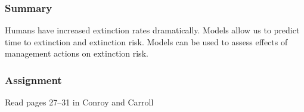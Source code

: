 \documentclass[color=usenames,dvipsnames]{beamer}\usepackage[]{graphicx}\usepackage[]{color}
\begin{document}
\begin{frame}
  \frametitle{Summary}
  \large
   Humans have increased extinction rates dramatically. \vfill
   Models allow us to predict time to extinction and extinction risk. \vfill
   Models can be used to assess effects of management actions on
   extinction risk. \vfill
\end{frame}



\begin{frame}
  \frametitle{Assignment}
  \LARGE
  \centering
  Read pages 27--31 in Conroy and Carroll \par
\end{frame}
\end{document}
